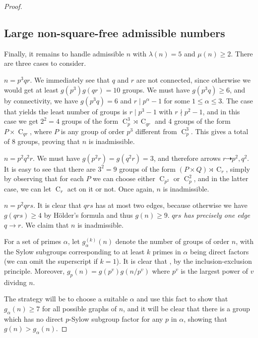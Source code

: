 \documentclass[a4paper, 12pt]{article}
\newcommand{\cyc}[1]{\operatorname{C}_{#1}}
\theoremstyle{plain}
\theoremstyle{definition}
\begin{document}
\begin{proof}
\subsection{Large non-square-free admissible numbers} 
Finally, it remains to handle admissible $n$ with $\lambda(n) = 5$ and $\mu(n) \ge 2$. There are three cases to consider.

 $n = p^3 q r$.
We immediately see that $q$ and $r$ are not connected, since otherwise we would get at least $g(p^3)g(qr) = 10$ groups. We must have $g(p^3 q) \ge 6$, and by connectivity, we have $g(p^3 q) = 6$ and $r \mid p^\alpha - 1$ for some $1 \le \alpha \le 3$. The case that yields the least number of groups is $r \mid p^3 - 1$ with $r \nmid p^2 - 1$, and in this case we get $2^2 = 4$ groups of the form $\cyc{p}^3 \rtimes \cyc{qr}$ and 4 groups of the form $P \times \cyc{qr}$, where $P$ is any group of order $p^3$ different from $\cyc{p}^3$. This gives a total of 8 groups, proving that $n$ is inadmissible.

 $n = p^2 q^2 r$.
We must have $g(p^2 r) = g(q^2 r) = 3$, and therefore arrows $r \dashrightarrow p^2, q^2$. It is easy to see that there are $3^2 = 9$ groups of the form $(P \times Q) \rtimes \cyc{r}$, simply by observing that for each $P$ we can choose either $\cyc{p^2}\text{ or }\cyc{p}^2$, and in the latter case, we can let $\cyc{r}$ act on it or not. Once again, $n$ is inadmissible.
 
 $n = p^2 q r s$. It is clear that $qrs$ has at most two edges, because otherwise we have $g(qrs) \ge 4$ by Hölder's formula and thus $g(n) \ge 9$.
 \emph{$qrs$ has precisely one edge $q \rightarrow r$.} We claim that $n$ is inadmissible.\nopagebreak

For a set of primes $\alpha$, let $g^{(k)}_\alpha(n)$ denote the number of groups of order $n$, with the Sylow subgroups corresponding to at least $k$ primes in $\alpha$ being direct factors (we can omit the superscript if $k = 1$). It is clear that , by the inclusion-exclusion principle. Moreover, $g_p(n) = g(p^v)g(n/p^v)$ where $p^v$ is the largest power of $v$ dividng $n$.

The strategy will be to choose a suitable $\alpha$ and use this fact to show that $g_\alpha(n) \ge 7$ for all possible graphs of $n$, and it will be clear that there is a group which has no direct $p$-Sylow subgroup factor for any $p$ in $\alpha$, showing that $g(n) > g_\alpha(n)$.


\end{proof}
\end{document}
